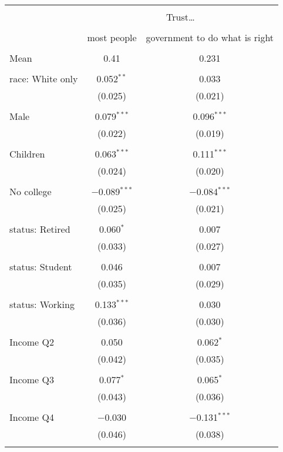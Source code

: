 
\begin{tabular}{@{\extracolsep{5pt}}lcc} 
\\[-1.8ex]\hline 
\hline \\[-1.8ex] 
 & \multicolumn{2}{c}{Trust…} \\ 
\cline{2-3} 
\\[-1.8ex] & most people & government to do what is right \\ 
\hline \\[-1.8ex] 
 Mean & 0.41 & 0.231  \\ \hline \\[-1.8ex] race: White only & 0.052$^{**}$ & 0.033 \\ 
  & (0.025) & (0.021) \\ 
  & & \\ 
 Male & 0.079$^{***}$ & 0.096$^{***}$ \\ 
  & (0.022) & (0.019) \\ 
  & & \\ 
 Children & 0.063$^{***}$ & 0.111$^{***}$ \\ 
  & (0.024) & (0.020) \\ 
  & & \\ 
 No college & $-$0.089$^{***}$ & $-$0.084$^{***}$ \\ 
  & (0.025) & (0.021) \\ 
  & & \\ 
 status: Retired & 0.060$^{*}$ & 0.007 \\ 
  & (0.033) & (0.027) \\ 
  & & \\ 
 status: Student & 0.046 & 0.007 \\ 
  & (0.035) & (0.029) \\ 
  & & \\ 
 status: Working & 0.133$^{***}$ & 0.030 \\ 
  & (0.036) & (0.030) \\ 
  & & \\ 
 Income Q2 & 0.050 & 0.062$^{*}$ \\ 
  & (0.042) & (0.035) \\ 
  & & \\ 
 Income Q3 & 0.077$^{*}$ & 0.065$^{*}$ \\ 
  & (0.043) & (0.036) \\ 
  & & \\ 
 Income Q4 & $-$0.030 & $-$0.131$^{***}$ \\ 
  & (0.046) & (0.038) \\ 
  & & \\ 

\end{tabular}
